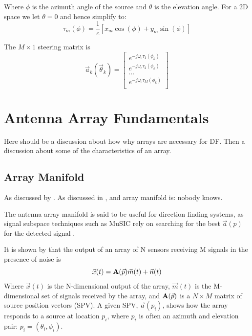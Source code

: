 Where \(\phi\) is the azimuth angle of the source and \(\theta\) is the elevation angle.
For a 2D space we let \(\theta = 0\) and hence simplify to:
\begin{equation}
 \tau_m(\phi) = \frac{1}{c} [ x_m\cos(\phi) + y_m\sin(\phi) ]
\end{equation}

The \(M \times 1\) steering matrix is
\begin{equation}
  \vec{a}_k(\vec{\theta}_k) = 
  \begin{bmatrix}
    e^{-j\omega_c \tau_1(\phi_k)} \\
    e^{-j\omega_c \tau_2(\phi_k)} \\
    ... \\
    e^{-j\omega_c \tau_M(\phi_k)} \\
  \end{bmatrix}
\end{equation}

\section{Antenna Array Fundamentals}
Here should be a discussion about how why arrays are necessary for DF. Then a discussion about some of the characteristics of an array.
\subsection{Array Manifold}
As discussed by \cite{sleiman2000antenna} \cite{karimi1996manifold} \cite{dacos1995estimating}. 
As discussed in \cite{sleiman2000antenna}, and array manifold is: nobody knows.

The antenna array manifold is said to be useful for direction finding systems, as signal subspace techniques such as MuSIC rely on searching for the best \(\vec{a}(p)\) for the detected signal \cite{karimi1996manifold}. 

It is shown by \cite{dacos1995estimating} that the output of an array of N sensors receiving M signals in the presence of noise is
\begin{equation}
\vec{x}(t) = \mathbf{A}(\vec{p})\vec{m}(t) + \vec{n}(t)
\end{equation}
Where \(\vec{x}(t)\) is the N-dimensional output of the array, \(\vec{m}(t)\) is the M-dimensional set of signals received by the array, and \(\mathbf{A}(\vec{p})\) is a \(N \times M\) matrix of source position vectors (SPV). 
A given SPV, \(\vec{a}(p_i)\), shows how the array responds to a source at location \(p_i\), where \(p_i\) is often an azimuth and elevation pair: \(p_i = (\theta_i, \phi_i)\).

